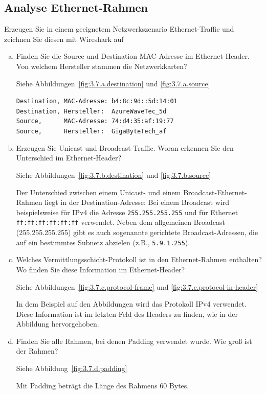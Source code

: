 \setcounter{section}{3}
\setcounter{subsection}{6} %
\subsection{Analyse Ethernet-Rahmen}

Erzeugen Sie in einem geeignetem Netzwerkszenario Ethernet-Traffic und zeichnen
Sie diesen mit Wireshark auf
\begin{enumerate}[(a)]
    \item Finden Sie die Source und Destination MAC-Adresse im Ethernet-Header.
        Von welchem Hersteller stammen die Netzwerkkarten?

        Siehe Abbildungen~\ref{fig:3.7.a.destination} und \ref{fig:3.7.a.source}

        \verb|Destination, MAC-Adresse: b4:8c:9d::5d:14:01| \\
        \verb|Destination, Hersteller:  AzureWaveTec_5d| \\
        \verb|Source,      MAC-Adresse: 74:d4:35:af:19:77| \\
        \verb|Source,      Hersteller:  GigaByteTech_af|

    \item Erzeugen Sie Unicast und Broadcast-Traffic. Woran erkennen Sie den
        Unterschied im Ethernet-Header?

        Siehe Abbildungen~\ref{fig:3.7.b.destination} und \ref{fig:3.7.b.source}

        Der Unterschied zwischen einem Unicast- und einem
        Broadcast-Ethernet-Rahmen liegt in der Destination-Adresse: Bei einem
        Broadcast wird beispielsweise für IPv4 die Adresse
        \verb|255.255.255.255| und für Ethernet \verb|ff:ff:ff:ff:ff:ff|
        verwendet. Neben dem allgemeinen Broadcast (255.255.255.255) gibt es
        auch sogenannte gerichtete Broadcast-Adressen, die auf ein bestimmtes
        Subnetz abzielen (z.B., \verb|5.9.1.255|).

    \item Welches Vermittlungsschicht-Protokoll ist in den Ethernet-Rahmen
        enthalten? Wo finden Sie diese Information im Ethernet-Header?

        Siehe Abbildungen~\ref{fig:3.7.c.protocol-frame} und \ref{fig:3.7.c.protocol-in-header}

        In dem Beispiel auf den Abbildungen wird das Protokoll IPv4 verwendet.
        Diese Information ist im letzten Feld des Headers zu finden, wie in der
        Abbildung hervorgehoben.

    \item Finden Sie alle Rahmen, bei denen Padding verwendet wurde. Wie groß
        ist der Rahmen?

        Siehe Abbildung~\ref{fig:3.7.d.padding}

        Mit Padding beträgt die Länge des Rahmens 60 Bytes.
\end{enumerate}


